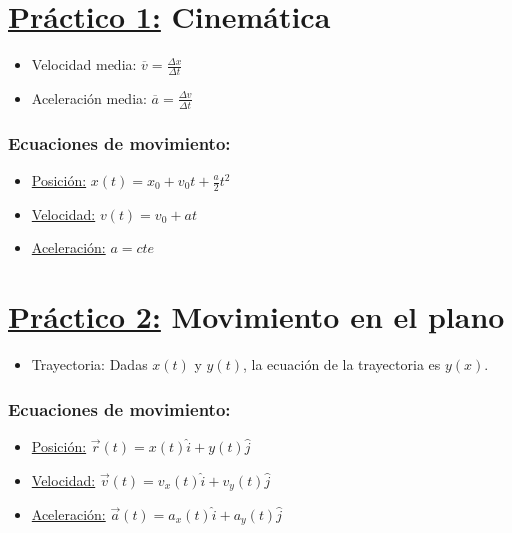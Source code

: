 \documentclass[12pt,a4paper]{article}
\begin{document}
	\section*{\underline{Práctico 1:} Cinemática}
		\begin{multicols}{2}
			\begin{itemize}
				\item Velocidad media: $\overline{v} = \frac{\Delta x}{\Delta t}$
				\item Aceleración media: $\overline{a} = \frac{\Delta v}{\Delta t}$
			\end{itemize}
		\end{multicols}

		\subsubsection*{Ecuaciones de movimiento:}
			\begin{multicols}{3}
				\begin{itemize}
					\item \underline{Posición:} $x(t) = x_{0} + v_{0} t + \frac{a}{2} t^{2}$
					\item \underline{Velocidad:} $v(t) = v_{0} + at$
					\item \underline{Aceleración:} $a = cte$
				\end{itemize}
			\end{multicols}

	\section*{\underline{Práctico 2:} Movimiento en el plano}
		\begin{itemize}
			\item Trayectoria: Dadas $x(t)$ y $y(t)$, la ecuación de la trayectoria es $y(x)$.
		\end{itemize}

		\subsubsection*{Ecuaciones de movimiento:}
			\begin{itemize}
				\item \underline{Posición:} $\vec{r}(t) = x(t) \hat{i} + y(t) \hat{j}$
				\item \underline{Velocidad:} $\vec{v}(t) = v_{x}(t) \hat{i} + v_{y}(t) \hat{j}$
				\item \underline{Aceleración:} $\vec{a}(t) = a_{x}(t) \hat{i} + a_{y}(t) \hat{j}$
			\end{itemize}
\end{document}
